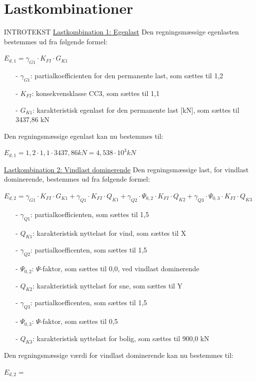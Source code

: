 \section{Lastkombinationer}
INTROTEKST
\newline
\newline
\underline{Lastkombination 1: Egenlast}
\newline
Den regningsmæssige egenlasten bestemmes ud fra følgende formel:
\begin{center}
	$E_{d,1}=\gamma_{G1}\cdot K_{FI}\cdot G_{K1}$
\end{center}
\begin{itemize}
	\item[-] $\gamma_{G1}$: partialkoefficienten for den permanente last, som sættes til 1,2 \citep[ tabel A 1.2(B+C) anneks A.1.3.1]{EU90}
	\item[-] $K_{FI}$: konsekvensklasse CC3, som sættes til 1,1 \citep[ tabel A 1.2(A) anneks A.1.3.1]{EU90}
	\item[-] $G_{K1}$: karakteristisk egenlast for den permanente last [kN], som sættes til 3437,86 kN
\end{itemize}
Den regningsmæssige egenlast kan nu bestemmes til:
\begin{center}
	$E_{d,1}=1,2\cdot 1,1\cdot 3437,86 kN=4,538\cdot 10^3 kN$
\end{center}
\underline{Lastkombination 2: Vindlast dominerende}
\newline
Den regningsmæssige last, for vindlast dominerende, bestemmes ud fra følgende formel:
\begin{center}
	$E_{d,2}=\gamma_{G1}\cdot K_{FI}\cdot G_{K1}+\gamma_{Q1}\cdot K_{FI}\cdot Q_{K1}+\gamma_{Q2}\cdot \Psi_{0,2}\cdot K_{FI}\cdot Q_{K2}+\gamma_{Q3}\cdot \Psi_{0,3}\cdot K_{FI}\cdot Q_{K3}$
\end{center}
\begin{itemize}
	\item[-] $\gamma_{Q1}$: partialkoefficienten, som sættes til 1,5 \citep[ tabel A 1.2(B+C) anneks A.1.3.1]{EU90}
	\item[-] $Q_{K1}$: karakteristisk nyttelast for vind, som sættes til X
	\item[-] $\gamma_{Q2}$: partialkoefficenten, som sættes til 1,5 \citep[ tabel A 1.2(B+C) anneks A.1.3.1]{EU90}
	\item[-] $\Psi_{0,2}$: $\Psi$-faktor, som sættes til 0,0, ved vindlast dominerende \citep[ tabel A 1.1 anneks A.1.2.2]{EU90}
	\item[-] $Q_{K2}$: karakteristisk nyttelast for sne, som sættes til Y
	\item[-] $\gamma_{Q3}$: partialkoefficenten, som sættes til 1,5 \citep[ tabel A 1.2(B+C) anneks A.1.3.1]{EU90}
	\item[-] $\Psi_{0,3}$: $\Psi$-faktor, som sættes til 0,5 \citep[ tabel A 1.1 anneks A.1.2.2]{EU90}
	\item[-] $Q_{K3}$: karakteristisk nyttelast for bolig, som sættes til 900,0 kN
\end{itemize}
Den regningsmæssige værdi for vindlast dominerende kan nu bestemmes til:
\begin{center}
	$E_{d,2}=$
\end{center}

